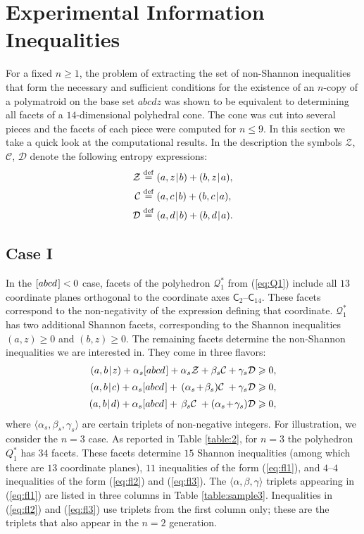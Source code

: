 \documentclass[reqno]{amsart}
\theoremstyle{definition}
\newcommand\tsp{\mkern 1.5mu}
\def\|{\mkern1.5mu{|}\mkern1.5mu}
\renewcommand\ge{\geqslant}\renewcommand\le{\leqslant}
\newcommand\C{\mathcal C}
\newcommand\Co{\mathsf C} %
\newcommand\D{\mathcal D}
\newcommand\Z{\mathcal Z} %
\def\<{\langle}\def\>{\rangle}
\newcommand\eqdef{\stackrel{\mathrm{def}}{=}}
\def\m#1{\tsp{#1}\tsp}
\def\abcd{[abcd\tsp]}
\newcommand\blabel[1]{\hypertarget{#1}{}}
\begin{document}

\section{Experimental Information Inequalities}\label{sec:ineq}

For a fixed $n\ge 1$, the problem of extracting the set of non-Shannon
inequalities that form the necessary and sufficient conditions for the
existence of an $n$-copy of a polymatroid on the base set $abcdz$ was shown
to be equivalent to determining all facets of a $14$-dimensional polyhedral
cone. The cone was cut into several pieces and the facets of each piece were
computed for $n\le 9$. In this section we take a quick look at the
computational results. In the description the symbols $\Z$, $\C$, $\D$
denote the following entropy expressions:
\begin{align*}
\Z &\eqdef (a,z\|b)+(b,z\|a), \\
\C &\eqdef (a,c\|b)+(b,c\|a), \\
\D &\eqdef (a,d\|b)+(b,d\|a).
\end{align*}

\subsection{Case I}\label{subsec:resc1}\blabel{subsec:resc1}

In the $\abcd<0$ case, facets of the polyhedron $\mathcal Q^*_1$ from
(\ref{eq:Q1}) include all $13$ coordinate planes orthogonal to the
coordinate axes $\Co_2$--$\Co_{14}$. These facets correspond to the
non-negativity of the expression defining that coordinate. $\mathcal Q^*_1$
has two additional Shannon facets, corresponding to the Shannon inequalities
$(a,z)\ge 0$ and $(b,z)\ge 0$. The remaining facets determine the
non-Shannon inequalities we are interested in. They come in three flavors:
\begin{align}
     (a,b\|z) + \alpha_s \abcd+\alpha_s\Z + \beta_s\C + \gamma_s\D &\ge 0,
     \label{eq:fl1}\\[2pt]
    (a,b\|c) + \alpha_s \abcd+ \,(\alpha_s\m+\beta_s)\C \tsp\,+ \gamma_s\D &\ge 0,
    \label{eq:fl2}\\[2pt]
   (a,b\|d)+  \alpha_s \abcd+\, \beta_s\C \tsp\,+ (\alpha_s\m+\gamma_s)\D &\ge 0,
   \label{eq:fl3}
\end{align}
where $\<\alpha_s,\beta_s,\gamma_s\>$ are certain triplets of non-negative
integers. For illustration, we consider the $n=3$ case. As reported in Table
\ref{table:2}, for $n=3$ the polyhedron $Q^*_1$ has $34$ facets. These
facets determine $15$ Shannon inequalities (among which there are $13$
coordinate planes), $11$ inequalities of the form (\ref{eq:fl1}), and
$4$--$4$ inequalities of the form (\ref{eq:fl2}) and (\ref{eq:fl3}). The
$\<\alpha,\beta,\gamma\>$ triplets appearing in (\ref{eq:fl1}) are listed in
three columns in Table \ref{table:sample3}. Inequalities in (\ref{eq:fl2})
and (\ref{eq:fl3}) use triplets from the first column only; these are the
triplets that also appear in the $n=2$ generation.
\end{document}
